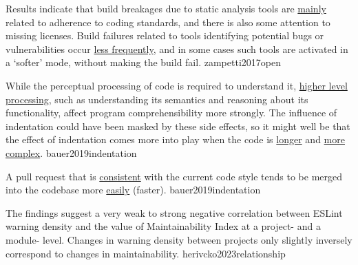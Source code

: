 \documentclass{article}
\begin{document}
  {Results indicate that build breakages due to static analysis tools are \ul{mainly} related to adherence to coding standards, and there is also some attention to missing licenses. Build failures related to tools identifying potential bugs or vulnerabilities occur \ul{less frequently}, and in some cases such tools are activated in a `softer' mode, without making the build fail.}
  {zampetti2017open}

  {While the perceptual processing of code is required to understand it, \ul{higher level processing}, such as understanding its semantics and reasoning about its functionality, affect program comprehensibility more strongly. The influence of indentation could have been masked by these side effects, so it might well be that the effect of indentation comes more into play when the code is \ul{longer} and \ul{more complex}.}
  {bauer2019indentation}

  {A pull request that is \ul{consistent} with the current code style tends to be merged into the codebase more \ul{easily} (faster).}
  {bauer2019indentation}

  {The findings suggest a very weak to strong negative correlation between ESLint warning density and the value of Maintainability Index at a project- and a module- level. Changes in warning density between projects only slightly inversely correspond to changes in maintainability.}
  {herivcko2023relationship}
\end{document}
